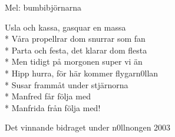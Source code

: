 \begin{SongText}
    \begin{SongInfo}
        Mel: bumbibjörnarna
    \end{SongInfo}
    \begin{SongVerse}
        Usla och kassa, gasquar en massa\\*%
        Våra propellrar dom snurrar som fan\\*%
        Parta och festa, det klarar dom flesta\\*%
        Men tidigt på morgonen super vi än\\*%
        Hipp hurra, för här kommer flygarn0llan\\*%
        Susar frammåt under stjärnorna\\*%
        Manfred får följa med\\*%
        Manfrida från följa med!
    \end{SongVerse}
    \begin{SongInfo}
        Det vinnande bidraget under n0llnongen 2003
    \end{SongInfo}
\end{SongText}
